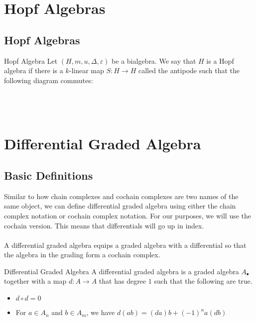 \documentclass[a4paper]{article}
\begin{document}
\pagebreak
\section{Hopf Algebras}
\subsection{Hopf Algebras}
\begin{defn}{Hopf Algebra}{} Let $(H,m,u,\Delta,\varepsilon)$ be a bialgebra. We say that $H$ is a Hopf algebra if there is a $k$-linear map $S:H\to H$ called the antipode such that the following diagram commutes: \\~\\
\\~\\
\end{defn}

\pagebreak

\section{Differential Graded Algebra}
\subsection{Basic Definitions}
Similar to how chain complexes and cochain complexes are two names of the same object, we can define differential graded algebra using either the chain complex notation or cochain complex notation. For our purposes, we will use the cochain version. This means that differentials will go up in index. \\~\\

A differential graded algebra equips a graded algebra with a differential so that the algebra in the grading form a cochain complex. 

\begin{defn}{Differential Graded Algebra}{} A differential graded algebra is a graded algebra $A_\bullet$ together with a map $d:A\to A$ that has degree $1$ such that the following are true. 
\begin{itemize}
\item $d\circ d=0$
\item For $a\in A_n$ and $b\in A_m$, we have $d(ab)=(da)b+(-1)^na(db)$
\end{itemize}
\end{defn}
\end{document}
